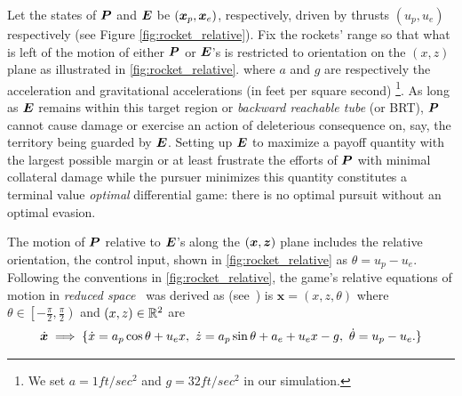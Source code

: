 Let the states of $\bm{P}$ and $\bm{E}$  be  $(\bm{x}_p, \bm{x}_e)$, respectively, driven by thrusts $(u_p, u_e)$ respectively  (see Figure \ref{fig:rocket_relative}). Fix the rockets' range so that what is left of the motion of either $\bm{P}$ or $\bm{E}$'s  is restricted to orientation on the $(x,{z})$ plane as illustrated in \autoref{fig:rocket_relative}. 
%
\noindent where $a$ and $g$ are respectively the acceleration and gravitational accelerations (in feet per square second) \footnote{We set $a=1 ft/sec^2$ and $g=32 ft/sec^2$ in our simulation.}.  
As long as $\bm{E}$  remains within this target region or \textit{backward reachable tube} (or BRT), $\bm{P}$ cannot cause damage or exercise an action of deleterious consequence on, say, the territory being guarded by $\bm{E}$. Setting up $\bm{E}$ to maximize a payoff quantity  with the largest possible margin or at least frustrate the efforts of $\bm{P}$ with minimal collateral damage while the pursuer minimizes this quantity constitutes a terminal value \textit{optimal} differential game: there is no optimal pursuit without an optimal evasion. %

The motion of $\bm{P}$  relative to $\bm{E}$'s  along  the $(\bm{x},\bm{z})$ plane includes the relative orientation, the control input, shown in \autoref{fig:rocket_relative} as $\theta=u_p- u_e$. Following the conventions in \autoref{fig:rocket_relative}, the game's relative equations of motion in \textit{reduced space}~\citet[\S 2.2]{Isaacs1965} was derived as (see~\citet[\S VI.A]{levpyconf})
is $\bm{x} = (x, {z}, {\theta})$ where ${\theta }\in \left[-\frac{\pi}{2}, \frac{\pi}{2}\right)$ and $(x,z) \in \mathbb{R}^2$ are 
%
%
\begin{align}
	\dot{\state} \implies \{ 
		\dot{x} = a_p \cos \theta + u_e x, \,\,
		\dot{z} =a_p \sin \theta + a_e + u_e x - g, \, \, %
		\dot{\theta} = u_p -u_e.
		\}
	\label{eq:rocket_me}
\end{align}

